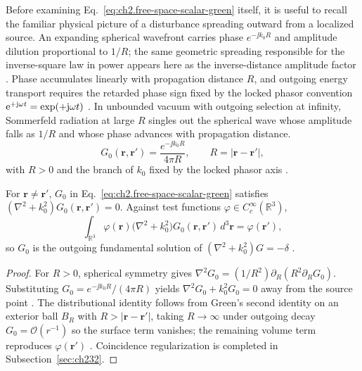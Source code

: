 Before examining Eq.~\eqref{eq:ch2.free-space-scalar-green} itself, it is useful to recall
the familiar physical picture of a disturbance spreading outward from a localized source.
An expanding spherical wavefront carries phase $e^{-\jj k_0 R}$ and amplitude dilution
proportional to $1/R$; the same geometric spreading responsible for the inverse-square law
in power appears here as the inverse-distance amplitude factor \cite{jackson1999}. Phase
accumulates linearly with propagation distance $R$, and outgoing energy transport requires
the retarded phase sign fixed by the locked phasor convention $\mathrm{e}^{+\mathrm{j}\omega t}=\exp(+\mathrm{j}\omega t)$
\cite{stratton1941}. In unbounded vacuum with outgoing selection at infinity, Sommerfeld
radiation at large $R$ singles out the spherical wave whose amplitude falls as $1/R$ and whose
phase advances with propagation distance.
\begin{equation}
\label{eq:ch2.free-space-scalar-green}
G_0(\mathbf{r},\mathbf{r}')
=
\frac{e^{-\jj k_0 R}}{4\pi R},
\qquad
R=|\mathbf{r}-\mathbf{r}'|,
\end{equation}
with \(R>0\) and the branch of \(k_0\) fixed by the locked phasor axis
\cite{stratton1941}.
\begin{proposition}
\label{prop:ch2.scalar-green-vacuum}
For $\mathbf{r}\neq\mathbf{r}'$, $G_0$ in Eq.~\eqref{eq:ch2.free-space-scalar-green} satisfies $(\nabla^{2}+k_0^{2})G_0(\mathbf{r},\mathbf{r}')=0$. Against test functions $\varphi\in C_{c}^{\infty}(\mathbb{R}^{3})$,
\begin{equation}
\label{eq:ch2.scalar-green-distributional}
\int_{\mathbb{R}^{3}}\varphi(\mathbf{r})\big(\nabla^{2}+k_0^{2}\big)G_0(\mathbf{r},\mathbf{r}')\,d^{3}\mathbf{r}
=\varphi(\mathbf{r}'),
\end{equation}
so $G_0$ is the outgoing fundamental solution of $(\nabla^{2}+k_0^{2})G=-\delta$ \cite{jackson1999}.
\end{proposition}
\begin{proof}
For $R>0$, spherical symmetry gives $\nabla^{2}G_0=(1/R^{2})\partial_R(R^{2}\partial_R G_0)$. Substituting $G_0=e^{-\jj k_0 R}/(4\pi R)$ yields $\nabla^{2}G_0+k_0^{2}G_0=0$ away from the source point \cite{jackson1999}. The distributional identity follows from Green's second identity on an exterior ball $B_R$ with $R>|\mathbf{r}-\mathbf{r}'|$, taking $R\to\infty$ under outgoing decay $G_0=\mathcal{O}(r^{-1})$ so the surface term vanishes; the remaining volume term reproduces $\varphi(\mathbf{r}')$ \cite{stratton1941}. Coincidence regularization is completed in Subsection~\ref{sec:ch232}.
\end{proof}
